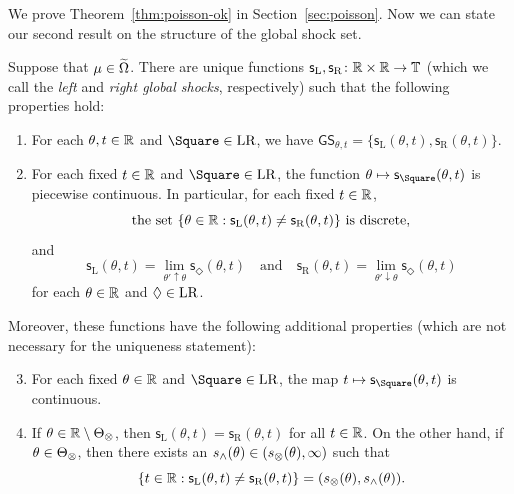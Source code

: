 \documentclass[AHL,Unicode,longabstracts]{cedram}
\newcommand*\GS{\mathsf{GS}}
\newcommand*\sfs{\mathsf{s}}
\newcommand*\TT{\mathbb{T}}
\newcommand*\RR{\mathbb{R}}
\newcommand*\st{\mathrel{:}}
\newcommand*\Left{\mathrm{L}}
\newcommand*\Right{\mathrm{R}}
\newcommand*\LR{\mathrm{LR}}
\renewcommand*{\to}{\mathchoice{\longrightarrow}{\rightarrow}{\rightarrow}{\rightarrow}}
\let\oldmapsto\mapsto
\renewcommand*{\mapsto}{\mathchoice{\longmapsto}{\oldmapsto}{\oldmapsto}{\oldmapsto}}
\let\oldin\in
\renewcommand{\in}{\mathchoice{\oldin}{\oldin}{\,\oldin\,}{\,\oldin\,}}
\let\originalleft\left
\let\originalright\right
\renewcommand{\left}{\mathopen{}\mathclose\bgroup\originalleft}
\renewcommand{\right}{\aftergroup\egroup\originalright}
\newcommand*\TT{\mathbb{T}}
\newcommand*\RR{\mathbb{R}}
\begin{document}
We prove Theorem~\ref{thm:poisson-ok} in Section~\ref{sec:poisson}. Now we can state our second result on the structure of the global shock set.
\begin{theo}\label{thm:shockstructure}
Suppose that $\mu\in\widetilde{\Omega}$. There are unique functions $\sfs_{\Left},\sfs_{\Right}\colon\RR\times\RR\to\TT$ (which we call the \emph{left} and \emph{right global shocks}, respectively) such that the following properties hold:
\begin{enumerate}
\item \label{enu:ssquareshocks}
For each $\theta,t\in\RR$ and $\Square\in\LR$, we have $\GS_{\theta,t}=\{\sfs_{\Left}(\theta,t),\sfs_{\Right}(\theta,t)\}$.
\item \label{enu:shocksleftright}
For each fixed $t\in\RR$ and $\Square\in\LR$, the function $\theta\mapsto\sfs_{\Square}(\theta,t)$ is piecewise continuous. In particular, for each fixed $t\in\RR$,
\begin{equation}\label{eq:sLnotsRdiscrete}
\text{the set }\left\{\theta\in\RR\st\sfs_{\Left}(\theta,t)\ne\sfs_{\Right}(\theta,t)\right\} \text{ is discrete},
\end{equation}
and
\begin{equation}\label{eq:sLsRareleftrightlimits}
\sfs_{\Left}(\theta,t)=\lim_{\theta'\uparrow\theta}\sfs_{\Diamond}(\theta,t)\quad\text{and}\quad\sfs_{\Right}(\theta,t)=\lim_{\theta'\downarrow\theta}\sfs_{\Diamond}(\theta,t)
\end{equation}
for each $\theta\in\RR$ and $\Diamond\in\LR$.
\end{enumerate}
Moreover, these functions have the following additional properties (which are not necessary for the uniqueness statement):
\begin{enumerate}
\setcounter{enumi}{2}
\item \label{enu:shockcontinuity}
For each fixed $\theta\in\RR$ and $\Square\in\LR$, the map $t\mapsto\sfs_{\Square}(\theta,t)$ is continuous.
\item \label{enu:splitatforcing}
If $\theta\in\RR\setminus\Theta_{\otimes}$, then $\sfs_{\Left}(\theta,t)=\sfs_{\Right}(\theta,t)$ for all $t\in\RR$. On the other hand, if $\theta\in\Theta_{\otimes}$, then there exists an $s_{\wedge}(\theta)\in(s_{\otimes}(\theta),\infty)$ such that
\[
\left\{t\in\RR\st\sfs_{\Left}(\theta,t)\ne\sfs_{\Right}(\theta,t)\right\}=\left(s_{\otimes}(\theta),s_{\wedge}(\theta)\right).
\]
\end{enumerate}
\end{theo}
\end{document}
